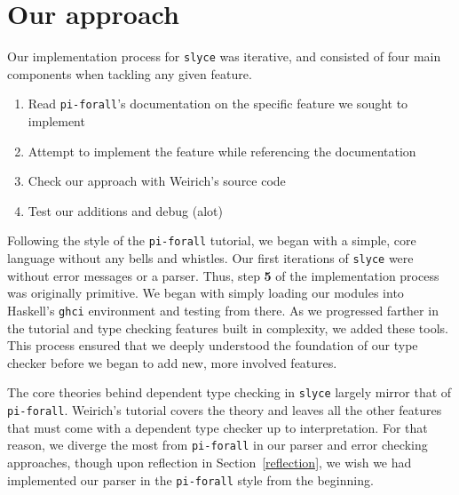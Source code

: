 \section{Our approach}
Our implementation process for \texttt{slyce} was iterative, and consisted of four main components when tackling any given feature.
\begin{enumerate}
    \item Read \texttt{pi-forall}'s documentation on the specific feature we sought to implement
    \item Attempt to implement the feature while referencing the documentation
    \item Check our approach with Weirich's source code
    \item Test our additions and debug (alot)
\end{enumerate}

Following the style of the \texttt{pi-forall} tutorial, we began with a simple, core language without any bells and whistles.
Our first iterations of \texttt{slyce} were without error messages or a parser.
Thus, step \textbf{5} of the implementation process was originally primitive. 
We began with simply loading our modules into Haskell's \texttt{ghci} environment and testing from there.
As we progressed farther in the tutorial and type checking features built in complexity, we added these tools.
This process ensured that we deeply understood the foundation of our type checker before we began to add new, more involved features. 

The core theories behind dependent type checking in \texttt{slyce} largely mirror that of \texttt{pi-forall}.
Weirich's tutorial covers the theory and leaves all the other features that must come with a dependent type checker up to interpretation.
For that reason, we diverge the most from \texttt{pi-forall} in our parser and error checking approaches, though upon reflection in Section~\ref{reflection}, we wish we had implemented our parser in the \texttt{pi-forall} style from the beginning.